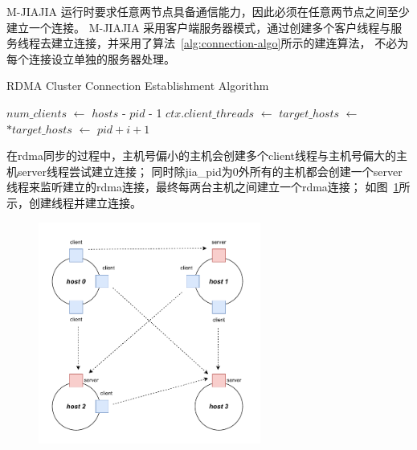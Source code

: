 {M-JIAJIA 运行时要求任意两节点具备通信能力，因此必须在任意两节点之间至少建立一个连接。
M-JIAJIA 采用客户端服务器模式，通过创建多个客户线程与服务线程去建立连接，并采用了算法~\ref{alg:connection-algo}所示的建连算法，
不必为每个连接设立单独的服务器处理。

\begin{algorithm}
\caption{RDMA Cluster Connection Establishment Algorithm}\label{alg:connection-algo}
\begin{algorithmic}[1]
\State {}
\EndIf
\State $num\_clients$ $\gets$ $hosts$ - $pid$ - 1
\State $ctx.client\_threads$ $\gets$  
\State $target\_hosts$ $\gets$ 
\State $*target\_hosts$ $\gets$ $pid + i + 1$
\State {}
\EndFor
\EndIf
{}
\State {}
\EndIf

\State {}
\EndFor
\EndIf
\EndProcedure
\end{algorithmic}
\end{algorithm}

在rdma同步的过程中，主机号偏小的主机会创建多个client线程与主机号偏大的主机server线程尝试建立连接；
同时除jia\_pid为0外所有的主机都会创建一个server线程来监听建立的rdma连接，最终每两台主机之间建立一个rdma连接；
如图~\ref{fig:RDMA-connection-build}所示，创建线程并建立连接。



\begin{figure}[H]
    \centering    
    \includegraphics[width=0.65\textwidth]{Img/rdma_sync.drawio.pdf}
    \label{fig:RDMA-connection-build}
\end{figure}



}
